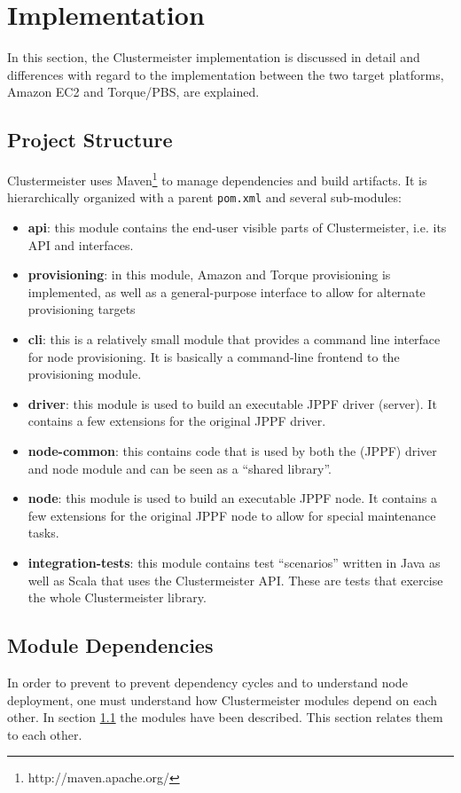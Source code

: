 \documentclass[english]{uzhpub}
\begin{document}
\section{Implementation}
\label{implementation}

In this section, the Clustermeister implementation is discussed in detail and differences with regard to the implementation between the two target platforms, Amazon EC2 and Torque/PBS, are explained.

\subsection{Project Structure}
\label{structure}

Clustermeister uses Maven\footnote{http://maven.apache.org/} to manage dependencies and build artifacts. It is hierarchically organized with a parent \texttt{pom.xml} and several sub-modules:

\begin{itemize}
 \item \textbf{api}: this module contains the end-user visible parts of Clustermeister, i.e. its API and interfaces.
 \item \textbf{provisioning}: in this module, Amazon and Torque provisioning is implemented, as well as a general-purpose interface to allow for alternate provisioning targets
 \item \textbf{cli}: this is a relatively small module that provides a command line interface for node provisioning. It is basically a command-line frontend to the provisioning module.
 \item \textbf{driver}: this module is used to build an executable JPPF driver (server). It contains a few extensions for the original JPPF driver.
 \item \textbf{node-common}: this contains code that is used by both the (JPPF) driver and node module and can be seen as a ``shared library''.
 \item \textbf{node}: this module is used to build an executable JPPF node. It contains a few extensions for the original JPPF node to allow for special maintenance tasks.
 \item \textbf{integration-tests}: this module contains test ``scenarios'' written in Java as well as Scala that uses the Clustermeister API. These are tests that exercise the whole Clustermeister library.
\end{itemize}

\subsection{Module Dependencies}
In order to prevent to prevent dependency cycles and to understand node deployment, one must understand how Clustermeister modules depend on each other. In section \ref{structure} the modules have been described. This section relates them to each other.
\end{document}
